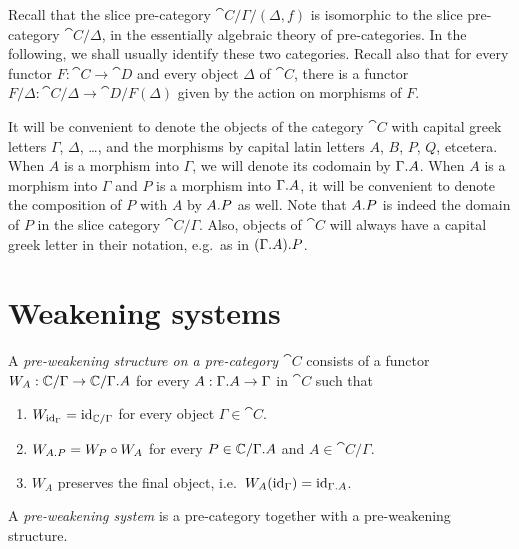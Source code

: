\begin{rmk}
Recall that the slice pre-category $\cat{C}/\Gamma/(\Delta,f)$ is isomorphic to the slice pre-category
$\cat{C}/\Delta$, in the essentially algebraic theory of pre-categories. In the following,
we shall usually identify these two categories. Recall also that for every functor
$F:\cat{C}\to\cat{D}$ and every object $\Delta$ of $\cat{C}$, there is a functor
$F/\Delta:\cat{C}/\Delta\to \cat{D}/F(\Delta)$ given by the action on morphisms of $F$. 
\end{rmk}

\begin{rmk}
It will be convenient to denote the objects of the category $\cat{C}$ with capital
greek letters $\Gamma$, $\Delta$, \ldots, and the morphisms by capital latin letters
$A$, $B$, $P$, $Q$, etcetera. When $A$ is a morphism into $\Gamma$, we will denote
its codomain by $\ctxext{\Gamma}{A}$. When $A$ is a morphism into $\Gamma$ and
$P$ is a morphism into $\ctxext{\Gamma}{A}$, it will be convenient to denote the
composition of $P$ with $A$ by $\ctxext{A}{P}$ as well. Note that $\ctxext{A}{P}$
is indeed the domain of $P$ in the slice category $\cat{C}/\Gamma$. Also, objects
of $\cat{C}$ will always have a capital greek letter in their notation, e.g.~as
in $\ctxext{{\Gamma}{A}}{P}$. 
\end{rmk}

\section{Weakening systems}

\begin{defn}
A \emph{pre-weakening structure on a pre-category $\cat{C}$} consists of a functor
$W_A:\cat{C}/\Gamma\to \cat{C}/\ctxext{\Gamma}{A}$ for every $A:\ctxext{\Gamma}{A}\to \Gamma$ in $\cat{C}$ such 
that
\begin{enumerate}
\item $W_{{\mathrm{id}_{\Gamma}}}={\mathrm{id}_{\mathbb{C}/\Gamma}}$ for every object $\Gamma\in\cat{C}$.
\item $W_{\ctxext{A}{P}}=W_P\circ W_A$ for every $P\in\cat{C}/\ctxext{\Gamma}{A}$ and $A\in\cat{C}/\Gamma$.
\item $W_A$ preserves the final object, i.e.~$W_A(\catid{\Gamma})=\catid{\ctxext{\Gamma}{A}}$.
\end{enumerate}
A \emph{pre-weakening system} is a pre-category together with a pre-weakening structure.
\end{defn}

